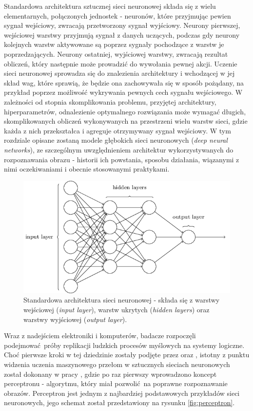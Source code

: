 \documentclass[12pt,a4paper,twoside]{article}
\begin{document}
Standardowa architektura sztucznej sieci neuronowej składa się z wielu elementarnych, połączonych jednostek - neuronów, które przyjmując pewien sygnał wejściowy, zwracają przetworzony sygnał wyjściowy. Neurony pierwszej, wejściowej warstwy przyjmują sygnał z danych uczących, podczas gdy neurony kolejnych warstw aktywowane są poprzez sygnały pochodzące z warstw je poprzedzających. Neurony ostatniej, wyjściowej warstwy, zwracają rezultat obliczeń, który następnie może prowadzić do wywołania pewnej akcji. Uczenie sieci neuronowej sprowadza się do znalezienia architektury i wchodzącej w jej skład wag, które sprawią, że będzie ona zachowywała się w sposób pożądany, na przykład poprzez możliwość wykrywania pewnych cech sygnału wejściowego. W zależności od stopnia skomplikowania problemu, przyjętej architektury, hiperparametrów, odnalezienie optymalnego rozwiązania może wymagać długich, skomplikowanych obliczeń wykonywanych na przestrzeni wielu warstw sieci, gdzie każda z nich przekształca i agreguje otrzymywany sygnał wejściowy. W tym rozdziale opisane zostaną modele głębokich sieci neuronowych (\textit{deep neural networks}), ze szczególnym uwzględnieniem architektur wykorzystywanych do rozpoznawania obrazu - historii ich powstania, sposobu działania, wiązanymi z nimi oczekiwaniami i obecnie stosowanymi praktykami.

\begin{figure}[h]
  \centering
\includegraphics[scale=0.5]{../obrazy/fig:NN.png}
\caption{Standardowa architektura sieci neuronowej - składa się z warstwy wejściowej (\textit{input layer}), warstw ukrytych (\textit{hidden layers}) oraz warstwy wyjściowej  (\textit{output layer}).
\label{fig:NN}}
\end{figure}

Wraz z nadejściem elektroniki i komputerów, badacze rozpoczęli podejmować próby replikacji ludzkich procesów myślowych na systemy logiczne. Choć pierwsze kroki w tej dziedzinie zostały podjęte przez \citet{mcculloch1943} oraz \citet{hebb1949}, istotny z punktu widzenia uczenia maszynowego przełom w sztucznych sieciach neuronowych został dokonany w pracy \citet{rosenblatt1957}, gdzie po raz pierwszy wprowadzono koncept perceptronu - algorytmu, który miał pozwolić na poprawne rozpoznawanie obrazów. Perceptron jest jednym z najbardziej podstawowych przykładów sieci neuronowych, jego schemat został przedstawiony na rysunku \ref{fig:perceptron}.
\end{document}
